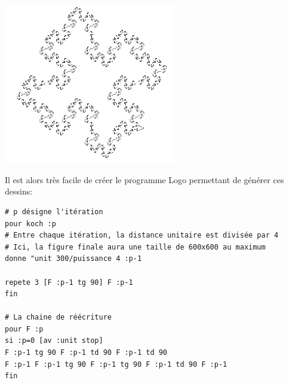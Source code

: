 \begin{center}
\begin{minipage}{7.5cm}
\end{minipage}
\begin{minipage}{7.5cm}
 \includegraphics[width=7.5cm]{images/linden-koch4.png}
\end{minipage}
\end{center}
Il est alors très facile de créer le programme Logo permettant de générer ces dessins:
\begin{verbatim}
# p désigne l'itération
pour koch :p
# Entre chaque itération, la distance unitaire est divisée par 4
# Ici, la figure finale aura une taille de 600x600 au maximum
donne "unit 300/puissance 4 :p-1

repete 3 [F :p-1 tg 90] F :p-1 
fin

# La chaine de réécriture
pour F :p
si :p=0 [av :unit stop]
F :p-1 tg 90 F :p-1 td 90 F :p-1 td 90
F :p-1 F :p-1 tg 90 F :p-1 tg 90 F :p-1 td 90 F :p-1
fin
\end{verbatim}
